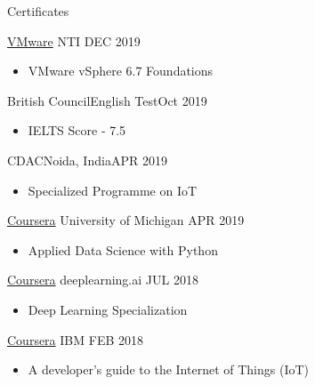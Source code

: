 \documentclass[]{mcdowellcv}
\begin{document}
\begin{cvsection}{Certificates}
		\begin{cvsubsection}{\href{https://www.youracclaim.com/badges/4e505240-2075-45c8-9e7a-2a1b01096ac0}{VMware}}
			{NTI}
			{DEC 2019}
			\begin{itemize}
				\item VMware vSphere 6.7 Foundations
			\end{itemize}
		\end{cvsubsection}
		\begin{cvsubsection}{British Council}{English Test}{Oct 2019}
			\begin{itemize}
				\item IELTS Score - 7.5
			\end{itemize}
		\end{cvsubsection}
		\begin{cvsubsection}{CDAC}{Noida, India}{APR 2019}
			\begin{itemize}
				\item Specialized Programme on IoT
			\end{itemize}
		\end{cvsubsection}
		\begin{cvsubsection}{\href{https://www.coursera.org/account/accomplishments/specialization/certificate/54XBCHQ9B8LY}{Coursera}}
			{University of Michigan}
			{APR 2019}
			\begin{itemize}
				\item Applied Data Science with Python
			\end{itemize}
		\end{cvsubsection}
		\begin{cvsubsection}
			{\href{https://www.coursera.org/account/accomplishments/specialization/certificate/LXSXVVTWLGMQ}{Coursera}}
			{deeplearning.ai}
			{JUL 2018}
			\begin{itemize}
				\item Deep Learning Specialization
			\end{itemize}
		\end{cvsubsection}
		\begin{cvsubsection}
			{\href{https://www.youracclaim.com/badges/95fb9f77-9229-4909-bae7-8900f7d605eb/public_url}
				{Coursera}}
			{IBM}
			{FEB 2018}
			\begin{itemize}
				\item A developer's guide to the Internet of Things (IoT)
			\end{itemize}
		\end{cvsubsection}
		\begin{cvsubsection}

\end{cvsubsection}
\end{cvsection}
\end{document}

